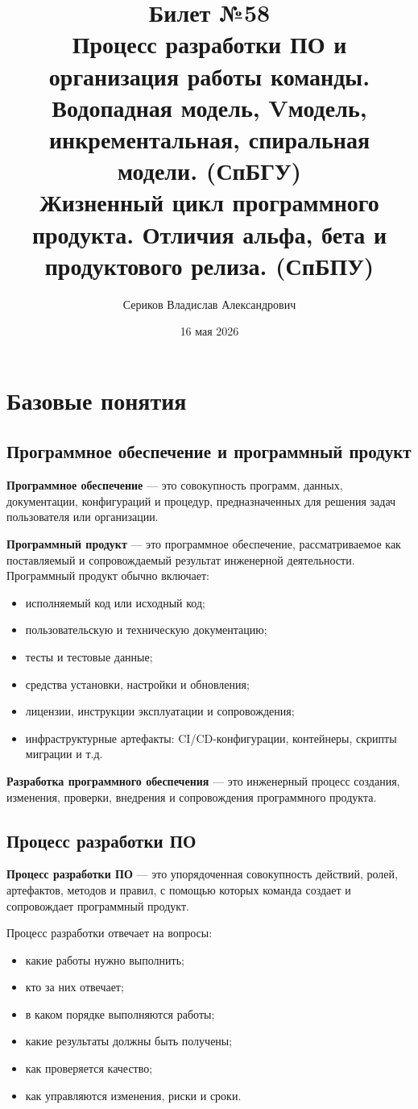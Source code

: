 \documentclass[12pt,a4paper]{article}
\title{Билет №58 \\ \small Процесс разработки ПО и организация работы команды. Водопадная модель, Vмодель, инкрементальная, спиральная модели. (СпБГУ) \\ Жизненный цикл программного продукта. Отличия альфа, бета и продуктового релиза. (СпБПУ)}
\author{Сериков Владислав Александрович}
\date{16 мая 2026}
\begin{document}
\maketitle
\tableofcontents
\newpage

\section{Базовые понятия}

\subsection{Программное обеспечение и программный продукт}

\textbf{Программное обеспечение} --- это совокупность программ, данных, документации, конфигураций и процедур, предназначенных для решения задач пользователя или организации.

\textbf{Программный продукт} --- это программное обеспечение, рассматриваемое как поставляемый и сопровождаемый результат инженерной деятельности. Программный продукт обычно включает:
\begin{itemize}
    \item исполняемый код или исходный код;
    \item пользовательскую и техническую документацию;
    \item тесты и тестовые данные;
    \item средства установки, настройки и обновления;
    \item лицензии, инструкции эксплуатации и сопровождения;
    \item инфраструктурные артефакты: CI/CD-конфигурации, контейнеры, скрипты миграции и т.д.
\end{itemize}

\textbf{Разработка программного обеспечения} --- это инженерный процесс создания, изменения, проверки, внедрения и сопровождения программного продукта.

\subsection{Процесс разработки ПО}

\textbf{Процесс разработки ПО} --- это упорядоченная совокупность действий, ролей, артефактов, методов и правил, с помощью которых команда создает и сопровождает программный продукт.

Процесс разработки отвечает на вопросы:
\begin{itemize}
    \item какие работы нужно выполнить;
    \item кто за них отвечает;
    \item в каком порядке выполняются работы;
    \item какие результаты должны быть получены;
    \item как проверяется качество;
    \item как управляются изменения, риски и сроки.
\end{itemize}
\end{document}
